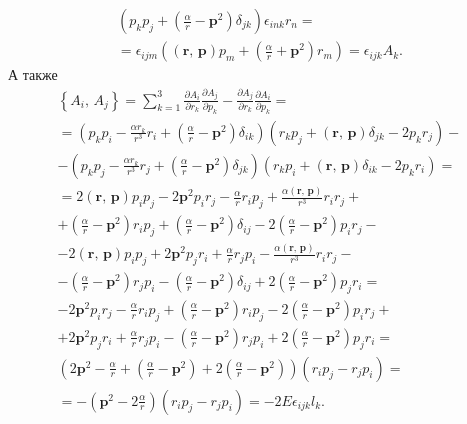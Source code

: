 \documentclass[a4paper]{article}
\begin{document}
\begin{sol}
\begin{multline*}
\left(p_kp_j +\left(\frac{\alpha}{r}-\mathbf{p}^2\right) \delta_{jk} \right) 
\epsilon_{ink}r_n =\\
=\epsilon _{ijm}\left((\mathbf{r},\,\mathbf{p})p_m+
\left( \frac{\alpha}{r}+\mathbf{p}^2 \right) r_m\right)=
\epsilon _{ijk}A_k
.\end{multline*} 
А также
\begin{multline*}
\left\{ A_i,\,A_j \right\} =
\sum_{k=1}^{3} \frac{\partial A_i}{\partial r_k} 
\frac{\partial A_j}{\partial p_k} -
\frac{\partial A_j}{\partial r_k} \frac{\partial A_i}{\partial p_k} =\\=
\left(p_kp_i - \frac{\alpha r_k}{r^3}r_i+\left(\frac{\alpha}{r}-\mathbf{p}^2\right) \delta_{ik} \right)
\left(r_k p_j+(\mathbf{r},\,\mathbf{p})\delta_{jk}-2p_k r_j\right)-\\-
\left(p_kp_j - \frac{\alpha r_k}{r^3}r_j+\left(\frac{\alpha}{r}-\mathbf{p}^2\right) \delta_{jk} \right)
\left(r_k p_i+(\mathbf{r},\,\mathbf{p})\delta_{ik}-2p_k r_i\right)=\\=
2(\mathbf{r},\,\mathbf{p})p_ip_j-2\mathbf{p}^2p_i r_j-
\frac{\alpha}{r}r_i p_j+
\frac{\alpha(\mathbf{r},\,\mathbf{p})}{r^3}r_i r_j+\\+
\left( \frac{\alpha}{r}-\mathbf{p}^2 \right) r_i p_j
+\left( \frac{\alpha}{r}-\mathbf{p}^2 \right) \delta_{ij}-
2\left( \frac{\alpha}{r}-\mathbf{p}^2 \right) p_i r_j-\\
-2(\mathbf{r},\,\mathbf{p})p_ip_j+2\mathbf{p}^2p_j r_i+
\frac{\alpha}{r}r_j p_i-
\frac{\alpha(\mathbf{r},\,\mathbf{p})}{r^3}r_i r_j-\\-
\left( \frac{\alpha}{r}-\mathbf{p}^2 \right) r_j p_i
-\left( \frac{\alpha}{r}-\mathbf{p}^2 \right) \delta_{ij}+
2\left( \frac{\alpha}{r}-\mathbf{p}^2 \right) p_j r_i=\\
-2\mathbf{p}^2p_i r_j-
\frac{\alpha}{r}r_i p_j+
\left( \frac{\alpha}{r}-\mathbf{p}^2 \right) r_i p_j
-
2\left( \frac{\alpha}{r}-\mathbf{p}^2 \right) p_i r_j+\\
+2\mathbf{p}^2p_j r_i+
\frac{\alpha}{r}r_j p_i-
\left( \frac{\alpha}{r}-\mathbf{p}^2 \right) r_j p_i
+
2\left( \frac{\alpha}{r}-\mathbf{p}^2 \right) p_j r_i=\\
\left(2\mathbf{p}^2-
\frac{\alpha}{r}+
\left( \frac{\alpha}{r}-\mathbf{p}^2 \right)
+
2\left( \frac{\alpha}{r}-\mathbf{p}^2 \right)\right)(r_ip_j-r_jp_i)=\\=
-\left(\mathbf{p}^2 -2 \frac{\alpha}{r} \right) (r_i p_j
-r_j p_i)=-2E\epsilon _{ijk} l_k
.\end{multline*} 
\end{sol}
\end{document}

